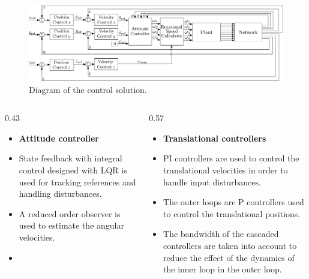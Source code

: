 \vspace{-1cm}
\begin{figure}
	\includegraphics[width=0.88\linewidth]{figures/TranslationalControlDiagram}
	\caption{Diagram of the control solution.}
\end{figure}

\begin{columns}[t,totalwidth=\twocolwid] %

	\begin{column}{0.43\twocolwid} %
  	 \centering
  	 \hspace{-2cm}
  	 \parbox{.88\textwidth}{
    	 \begin{itemize}
  	 			\item[]\textbf{Attitude controller}\\
  	 			\item State feedback with integral control designed with LQR is used for tracking references and handling disturbances.
  	 			\item A reduced order observer is used to estimate the angular velocities.
  	 			\item[]\vspace{5pt}
  	 		\end{itemize}
  	 }
	\end{column} %
	\hspace{-4cm}
	\begin{column}{0.57\twocolwid} %
  	 \centering
   	 \parbox{1\textwidth}{
       	 \begin{itemize}
    	 			\item[]\textbf{Translational controllers}\\
     	 			\item PI controllers are used to control the translational velocities in order to handle input disturbances.
     	 			\item The outer loops are P controllers used to control the translational positions.
     	 			\item The bandwidth of the cascaded controllers are taken into account to reduce the effect of the dynamics of the inner loop in the outer loop.
       	 \end{itemize}		
   	 }
	\end{column} %
	\vspace{-.5cm}
\end{columns} %